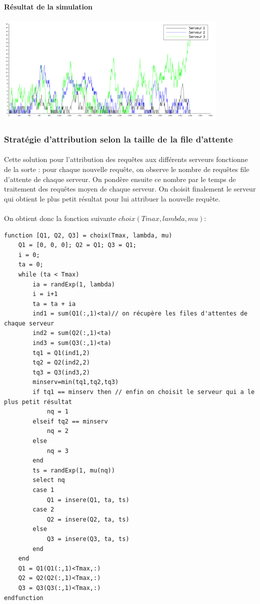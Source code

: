 \documentclass{article}
\begin{document}
\paragraph{Résultat de la simulation}
\begin{center}
	\includegraphics[width=425px]{img/semiCirculaire.png}
\end{center}

\subsubsection{Stratégie d'attribution selon la taille de la file d'attente}

\paragraph{}
Cette solution pour l'attribution des requêtes aux différents serveurs fonctionne de la sorte :  pour chaque nouvelle requête, on observe le nombre de requêtes file d'attente de chaque serveur. On pondère ensuite ce nombre par le temps de traitement des requêtes moyen de chaque serveur. On choisit finalement le serveur qui obtient le plus petit résultat pour lui attribuer la nouvelle requête.

\paragraph{}On obtient donc la fonction suivante $choix(Tmax,lambda,mu)$:
\begin{verbatim}
function [Q1, Q2, Q3] = choix(Tmax, lambda, mu)
    Q1 = [0, 0, 0]; Q2 = Q1; Q3 = Q1;
    i = 0;
    ta = 0; 
    while (ta < Tmax)
        ia = randExp(1, lambda)
        i = i+1 
        ta = ta + ia 
        ind1 = sum(Q1(:,1)<ta)// on récupère les files d'attentes de chaque serveur
        ind2 = sum(Q2(:,1)<ta)
        ind3 = sum(Q3(:,1)<ta)
        tq1 = Q1(ind1,2)
        tq2 = Q2(ind2,2)
        tq3 = Q3(ind3,2)
        minserv=min(tq1,tq2,tq3)
        if tq1 == minserv then // enfin on choisit le serveur qui a le plus petit résultat
            nq = 1
        elseif tq2 == minserv
            nq = 2
        else
            nq = 3
        end
        ts = randExp(1, mu(nq))
        select nq 
        case 1 
            Q1 = insere(Q1, ta, ts)
        case 2 
            Q2 = insere(Q2, ta, ts)
        else
            Q3 = insere(Q3, ta, ts)
        end
    end
    Q1 = Q1(Q1(:,1)<Tmax,:)
    Q2 = Q2(Q2(:,1)<Tmax,:)
    Q3 = Q3(Q3(:,1)<Tmax,:)
endfunction
\end{verbatim}
\end{document}
